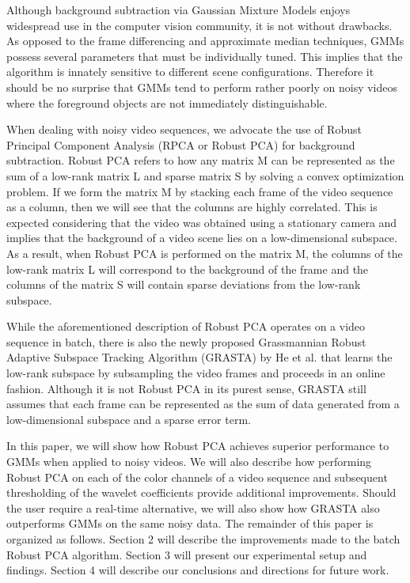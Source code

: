 \documentclass{article}
\begin{document}
Although background subtraction via Gaussian Mixture Models enjoys widespread use in the computer vision community, it is not without drawbacks. As opposed to the frame differencing and approximate median techniques, GMMs possess several parameters that must be individually tuned. This implies that the algorithm is innately sensitive to different scene configurations. Therefore it should be no surprise that GMMs tend to perform rather poorly on noisy videos where the foreground objects are not immediately distinguishable. 

When dealing with noisy video sequences, we advocate the use of Robust Principal Component Analysis (RPCA or Robust PCA) for background subtraction. Robust PCA \cite{RPCA09} refers to how any matrix M can be represented as the sum of a low-rank matrix L and sparse matrix S by solving a convex optimization problem. If we form the matrix M by stacking each frame of the video sequence as a column, then we will see that the columns are highly correlated. This is expected considering that the video was obtained using a stationary camera and implies that the background of a video scene lies on a low-dimensional subspace. As a result, when Robust PCA is performed on the matrix M, the columns of the low-rank matrix L will correspond to the background of the frame and the columns of the matrix S will contain sparse deviations from the low-rank subspace. 

While the aforementioned description of Robust PCA operates on a video sequence in batch, there is also the newly proposed Grassmannian Robust Adaptive Subspace Tracking Algorithm (GRASTA) by He et al. \cite{GRASTA12} that learns the low-rank subspace by subsampling the video frames and proceeds in an online fashion. Although it is not Robust PCA in its purest sense, GRASTA still assumes that each frame can be represented as the sum of data generated from a low-dimensional subspace and a sparse error term.

In this paper, we will show how Robust PCA achieves superior performance to GMMs when applied to noisy videos. We will also describe how performing Robust PCA on each of the color channels of a video sequence and subsequent thresholding of the wavelet coefficients provide additional improvements. Should the user require a real-time alternative, we will also show how GRASTA also outperforms GMMs on the same noisy data. The remainder of this paper is organized as follows. Section 2 will describe the improvements made to the batch Robust PCA algorithm. Section 3 will present our experimental setup and findings. Section 4 will describe our conclusions and directions for future work.
\end{document}
